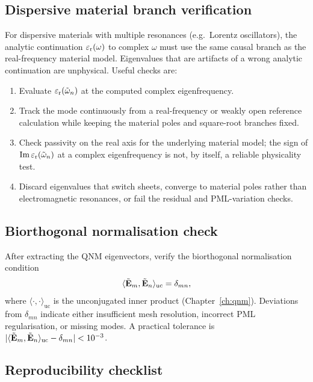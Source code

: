 \subsection{Dispersive material branch verification}
\label{ssec:dispersion-branches}

For dispersive materials with multiple resonances (e.g.\ Lorentz
oscillators), the analytic continuation $\varepsilon_{\mathrm{r}}(\omega)$ to complex
$\omega$ must use the same causal branch as the real-frequency material
model. Eigenvalues that are artifacts of a wrong analytic continuation
are unphysical. Useful checks are:
\begin{enumerate}
 \item Evaluate $\varepsilon_{\mathrm{r}}(\tilde{\omega}_n)$ at the computed complex
 eigenfrequency.
 \item Track the mode continuously from a real-frequency or weakly open
 reference calculation while keeping the material poles and square-root
 branches fixed.
 \item Check passivity on the real axis for the underlying material
 model; the sign of $\operatorname{Im}\varepsilon_{\mathrm{r}}(\tilde{\omega}_n)$ at a complex
 eigenfrequency is not, by itself, a reliable physicality test.
 \item Discard eigenvalues that switch sheets, converge to material
 poles rather than electromagnetic resonances, or fail the residual and
 PML-variation checks.
\end{enumerate}

\subsection{Biorthogonal normalisation check}
\label{ssec:biorthogonal-check}

After extracting the QNM eigenvectors, verify the biorthogonal
normalisation condition
\begin{equation}
 \langle \tilde{\mathbf{E}}_m, \tilde{\mathbf{E}}_n \rangle_{\mathrm{uc}}
 = \delta_{mn},
 \label{eq:biorthogonal-check}
\end{equation}
where $\langle\cdot,\cdot\rangle_{\mathrm{uc}}$ is the unconjugated
inner product (Chapter~\ref{ch:qnm}). Deviations from $\delta_{mn}$
indicate either insufficient mesh resolution, incorrect PML
regularisation, or missing modes. A practical tolerance is
$|\langle \tilde{\mathbf{E}}_m, \tilde{\mathbf{E}}_n \rangle_{\mathrm{uc}} -
\delta_{mn}| < 10^{-3}$.

\subsection{Reproducibility checklist}
\label{ssec:reproducibility}


